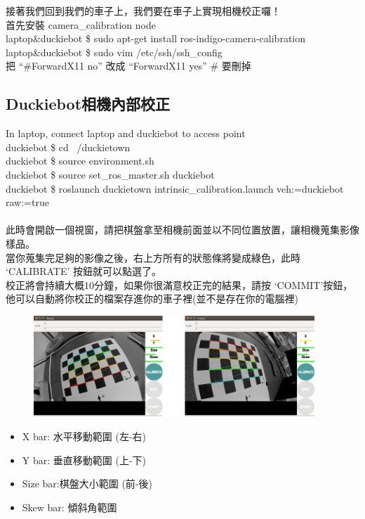 \documentclass{article}
\begin{document}
接著我們回到我們的車子上，我們要在車子上實現相機校正囉！
\\首先安裝 camera\_calibration node
\\laptop\&duckiebot \$ sudo apt-get install ros-indigo-camera-calibration
\\laptop\&duckiebot \$ sudo vim /etc/ssh/ssh\_config
\\把 “\#ForwardX11 no”  改成 “ForwardX11 yes”  \# 要刪掉

\subsection{Duckiebot相機內部校正}

In laptop, connect laptop and duckiebot to access point
\\duckiebot \$ cd ~/duckietown
\\duckiebot \$ source environment.sh
\\duckiebot \$ source set\_ros\_master.sh duckiebot
\\duckiebot \$ roslaunch duckietown intrinsic\_calibration.launch veh:=duckiebot raw:=true
\\
\\此時會開啟一個視窗，請把棋盤拿至相機前面並以不同位置放置，讓相機蒐集影像樣品。
\\當你蒐集完足夠的影像之後，右上方所有的狀態條將變成綠色，此時 ‘CALIBRATE’ 按鈕就可以點選了。
\\校正將會持續大概10分鐘，如果你很滿意校正完的結果，請按 ‘COMMIT’按鈕，他可以自動將你校正的檔案存進你的車子裡(並不是存在你的電腦裡)
\begin{figure}[htp]
    \begin{center}
        \includegraphics[width=300pt]{pic/圖片15.jpg}
    \end{center}
\end{figure}

\begin{itemize}

\item X bar: 水平移動範圍 (左-右)
\item Y bar: 垂直移動範圍 (上-下)
\item Size bar:棋盤大小範圍 (前-後)
\item Skew bar: 傾斜角範圍

\end{itemize}
\end{document}
